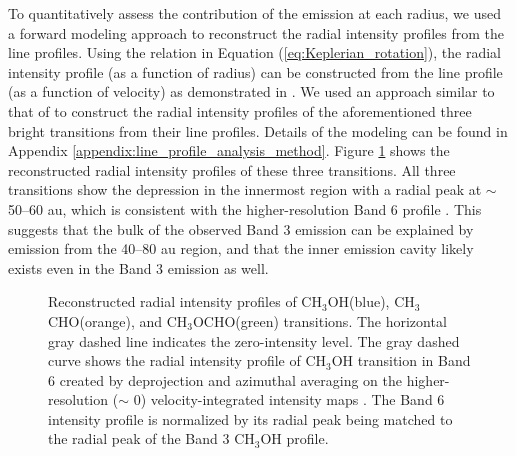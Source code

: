 \documentclass[twocolumn, twocolappendix, astrosymb, times]{aastex631}
\newcommand{\methanol}{CH$_3$OH\xspace}
\newcommand{\acetaldehyde}{CH$_3$CHO\xspace}
\newcommand{\methylformate}{CH$_3$OCHO\xspace}
\begin{document}
To quantitatively assess the contribution of the emission at each radius, we used a forward modeling approach to reconstruct the radial intensity profiles from the line profiles. Using the relation in Equation (\ref{eq:Keplerian_rotation}), the radial intensity profile (as a function of radius) can be constructed from the line profile (as a function of velocity) as demonstrated in \citet{Bosman2021}. We used an approach similar to that of \citet{Bosman2021} to construct the radial intensity profiles of the aforementioned three bright transitions from their line profiles. Details of the modeling can be found in Appendix \ref{appendix:line_profile_analysis_method}. Figure \ref{fig:radial_profile_from_line_profile} shows the reconstructed radial intensity profiles of these three transitions. All three transitions show the depression in the innermost region with a radial peak at $\sim$ 50--60 au, which is consistent with the higher-resolution Band 6 profile \citep{Tobin2023}. This suggests that the bulk of the observed Band 3 emission can be explained by emission from the 40--80 au region, and that the inner emission cavity likely exists even in the Band 3 emission as well. 

\begin{figure}
\caption{Reconstructed radial intensity profiles of \methanol (blue), \acetaldehyde (orange), and \methylformate (green) transitions. The horizontal gray dashed line indicates the zero-intensity level. The gray dashed curve shows the radial intensity profile of \methanol transition in Band 6 created by deprojection and azimuthal averaging on the higher-resolution ($\sim$ 0) velocity-integrated intensity maps \citep{Tobin2023}. The Band 6 intensity profile is normalized by its radial peak being matched to the radial peak of the Band 3 \methanol profile.}
\label{fig:radial_profile_from_line_profile}
\end{figure}
\end{document}
